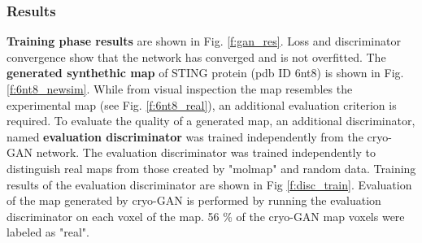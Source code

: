 \subsubsection{Results}
\textbf{Training phase results} are shown in Fig. \ref{f:gan_res}.
Loss and discriminator convergence show that the network  has converged and is not overfitted.
The \textbf{generated synthethic map } of  STING protein (pdb ID 6nt8) is shown in  Fig. \ref{f:6nt8_newsim}.
While from visual inspection the map resembles the experimental map (see Fig. \ref{f:6nt8_real}),  an additional evaluation criterion is required.
To evaluate the quality of a generated map, an additional discriminator, named \textbf{evaluation discriminator} was trained independently from the cryo-GAN network. 
The evaluation discriminator was trained independently to distinguish  real maps from those created by "molmap" and random data.
Training results of the evaluation discriminator are shown in Fig \ref{f:disc_train}.
Evaluation of the map generated by cryo-GAN is performed by running the evaluation discriminator on each  voxel of the map.
56 \% of the cryo-GAN map voxels were labeled as "real".




